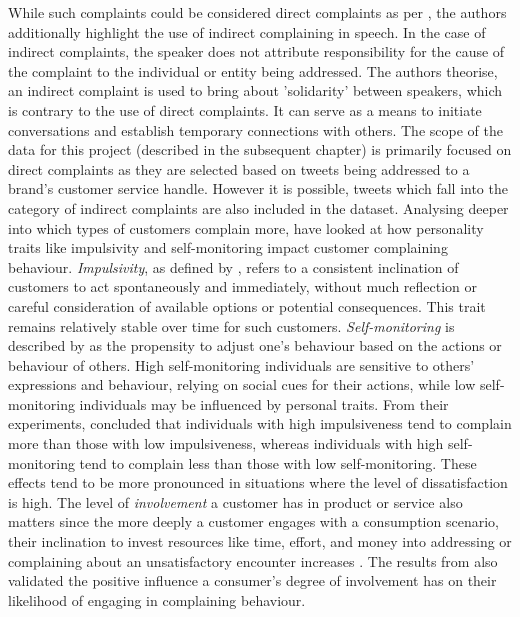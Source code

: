 While such complaints could be considered direct complaints as per \cite{boxerSocialDistanceSpeech1993}, the authors additionally highlight the use of indirect complaining in speech. In the case of indirect complaints, the speaker does not attribute responsibility for the cause of the complaint to the individual or entity being addressed. The authors theorise, an indirect complaint is used to bring about 'solidarity' between speakers, which is contrary to the use of direct complaints. It can serve as a means to initiate conversations and establish temporary connections with others. The scope of the data for this project (described in the subsequent chapter) is primarily focused on direct complaints as they are selected based on tweets being addressed to a brand's customer service handle. However it is possible, tweets which fall into the category of indirect complaints are also included in the dataset.
\newline \newline
Analysing deeper into which types of customers complain more, \cite{sharma_complainers_2010} have looked at how personality traits like impulsivity and self-monitoring impact customer complaining behaviour. \textit{Impulsivity}, as defined by \cite{rookNormativeInfluencesImpulsive1995}, refers to a consistent inclination of customers to act spontaneously and immediately,  without much reflection or careful consideration of available options or potential consequences. This trait remains relatively stable over time for such customers. \textit{Self-monitoring} is described by  \cite{bechererSelfMonitoringModeratingVariable1978} as the propensity to adjust one's behaviour based on the actions or behaviour of others. High self-monitoring individuals are sensitive to others' expressions and behaviour, relying on social cues for their actions, while low self-monitoring individuals may be influenced by personal traits. From their experiments, \cite{sharma_complainers_2010} concluded that individuals with high impulsiveness tend to complain more than those with low impulsiveness, whereas individuals with high self-monitoring tend to complain less than those with low self-monitoring. These effects tend to be more pronounced in situations where the level of dissatisfaction is high. The level of \textit{involvement} a customer has in product or service also matters since the more deeply a customer engages with a consumption scenario, their inclination to invest resources like time, effort, and money into addressing or complaining about an unsatisfactory encounter increases \cite{lauIndividualSituationalFactors2001}. The results from \cite{sharma_complainers_2010} also validated the positive influence a consumer's degree of involvement has on their likelihood of engaging in complaining behaviour.


